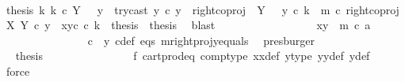 \begin{isabellebody}
\ \ \ \ \ \ \ \ \ \ \ \ \ \ \ \ \ \ \isamarkupfalse%
\ {\isacartoucheopen}{\isasymAnd}thesis{\isachardot}{\kern0pt}\ {\isacharparenleft}{\kern0pt}{\isasymAnd}k{\isachardot}{\kern0pt}\ k\ {\isasymin}\isactrlsub c\ Y\ {\isasymsetminus}\ {\isacharparenleft}{\kern0pt}{\isasymone}{\isacharcomma}{\kern0pt}\ y{}{\isacharparenright}{\kern0pt}\ {\isasymand}\ try{\isacharunderscore}{\kern0pt}cast\ y{}\ {\isasymcirc}\isactrlsub c\ y\ {\isacharequal}{\kern0pt}\ right{\isacharunderscore}{\kern0pt}coproj\ {\isasymone}\ {\isacharparenleft}{\kern0pt}Y\ {\isasymsetminus}\ {\isacharparenleft}{\kern0pt}{\isasymone}{\isacharcomma}{\kern0pt}\ y{}{\isacharparenright}{\kern0pt}{\isacharparenright}{\kern0pt}\ {\isasymcirc}\isactrlsub c\ k\ {\isasymand}\ m\ {\isasymcirc}\isactrlsub c\ right{\isacharunderscore}{\kern0pt}coproj\ X\ Y\ {\isasymcirc}\isactrlsub c\ y\ {\isacharequal}{\kern0pt}\ {\isasymlangle}x{}{\isacharcomma}{\kern0pt}y{}\isactrlsup c\ {\isasymcirc}\isactrlsub c\ k{\isasymrangle}\ {\isasymLongrightarrow}\ thesis{\isacharparenright}{\kern0pt}\ {\isasymLongrightarrow}\ thesis{\isacartoucheclose}\ \isamarkupfalse%
\ blast\isanewline
\ \ \ \ \ \ \ \ \ \ \ \ \ \ \ \ \isamarkupfalse%
\ {\isachardoublequoteopen}{\isasymlangle}x{}{\isacharcomma}{\kern0pt}y{}{\isasymrangle}\ {\isacharequal}{\kern0pt}\ m\ {\isasymcirc}\isactrlsub c\ a{\isachardoublequoteclose}\isanewline
\ \ \ \ \ \ \ \ \ \ \ \ \ \ \isamarkupfalse%
\ {\isacartoucheopen}c\ {\isacharequal}{\kern0pt}\ y{}{\isacartoucheclose}\ c{\isacharunderscore}{\kern0pt}def\ eqs\ m{\isacharunderscore}{\kern0pt}rightproj{\isacharunderscore}{\kern0pt}y{}{\isacharunderscore}{\kern0pt}equals\ \isamarkupfalse%
\ presburger\isanewline
\ \ \ \ \ \ \ \ \ \ \ \ \ \ \isamarkupfalse%
\ \isamarkupfalse%
\ {\isacharquery}{\kern0pt}thesis\isanewline
\ \ \ \ \ \ \ \ \ \ \ \ \ \ \isamarkupfalse%
\ f{}\ cart{\isacharunderscore}{\kern0pt}prod{\isacharunderscore}{\kern0pt}eq{}\ comp{\isacharunderscore}{\kern0pt}type\ x{}x{}{\isacharunderscore}{\kern0pt}def\ y{}{\isacharprime}{\kern0pt}{\isacharunderscore}{\kern0pt}type\ y{}y{}{\isacharunderscore}{\kern0pt}def{\isacharparenleft}{\kern0pt}{}{\isacharparenright}{\kern0pt}\ y{\isacharunderscore}{\kern0pt}def\ \isamarkupfalse%
\ force\isanewline
\ \ \ \ \ \ \ \ \ \ \ \ \ \ \isamarkupfalse%

\end{isabellebody}
